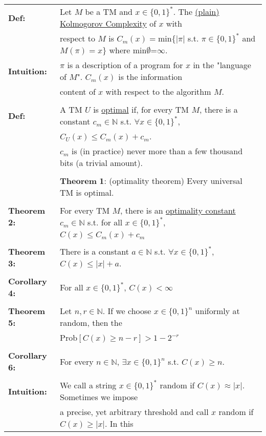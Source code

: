 \documentclass[11pt]{article}
\begin{document}
\begin{longtable}{ll}
{\bf Def:} & Let $M$ be a TM and $x\in\{0,1\}^*$. The \underline{(plain) Kolmogorov Complexity} of $x$ with \\
& respect to $M$ is $C_m(x) = \text{min}\{|\pi|$ s.t. $\pi\in\{0,1\}^*$ and $M(\pi)=x\}$ where min$\emptyset$=$\infty$. \\
{\bf Intuition:} & $\pi$ is a description of a program for $x$ in the "language of $M$". $C_m(x)$ is the information \\
& content of $x$ with respect to the algorithm $M$. \\
\\
{\bf Def:} & A TM $U$ is \underline{optimal} if, for every TM $M$, there is a constant $c_m\in\mathbb{N}$ s.t. $\forall x \in \{0,1\}^*$, \\
& $C_U(x)\leqslant C_m(x) + c_m$. \\
& $c_m$ is (in practice) never more than a few thousand bits (a trivial amount). \\
& \\
& $\textbf{Theorem 1:}$ (optimality theorem) Every universal TM is optimal. \\
\\
{\bf Theorem 2:} & For every TM $M$, there is an \underline{optimality constant} $c_m \in \mathbb{N}$ s.t. for all $x\in\{0,1\}^*$, \\
& $C(x) \leqslant C_m(x) + c_m$ \\
\\
{\bf Theorem 3:} & There is a constant $a \in \mathbb{N}$ s.t. $\forall x \in \{0,1\}^*$, $C(x) \leqslant |x| + a$. \\
\\
{\bf Corollary 4:} & For all $x\in\{0,1\}^*$, $C(x) < \infty$ \\
\\
{\bf Theorem 5:} & Let $n,r\in\mathbb{N}$. If we choose $x\in\{0,1\}^n$ uniformly at random, then the \\
& Prob$[C(x)\geqslant n - r]>1-2^{-r}$ \\
\\
{\bf Corollary 6:} & For every $n\in\mathbb{N}$, $\exists x\in\{0,1\}^n$ s.t. $C(x) \geqslant n$. \\
\\
{\bf Intuition:} & We call a string $x\in\{0,1\}^*$ random if $C(x)\approx |x|$. Sometimes we impose \\
& a precise, yet arbitrary threshold and call $x$ random if $C(x) \geqslant |x|$. In this \\

\end{longtable}
\end{document}
